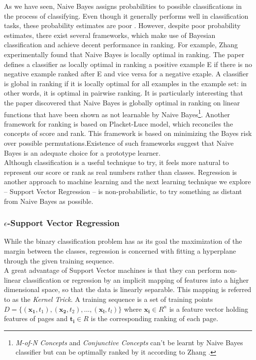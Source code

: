 \documentclass[12pt,twoside,notitlepage]{report}
\begin{document}
As we have seen, Naive Bayes assigns probabilities to possible classifications
in the process of classifying. Even though it generally performs well in
classification tasks, these probability estimates are poor \cite{domingos96}.
However, despite poor probability estimates, there exist several frameworks,
which make use of Bayesian classification and achieve decent performance in
ranking. For example, Zhang \cite{zhang04} experimentally found that Naive
Bayes is locally optimal in ranking. The paper defines a classifier as locally
optimal in ranking a positive example E if there is no negative example ranked
after E and vice versa for a negative exaple. A classifier is global in ranking
if it is locally optimal for all examples in the example set: in other words,
it is optimal in pairwise ranking.  It is particularly interesting that the
paper discovered that Naive Bayes is globally optimal in ranking on linear
functions that have been shown as not learnable by Naive
Bayes\footnote{\textit{M-of-N
  Concepts} and \textit{Conjunctive Concepts} can't be learnt by Naive Bayes classifier but
can be optimally ranked by it according to Zhang \cite{zhang04}.}.
Another framework for ranking \cite{bayesrank} is based on Placket-Luce model, which reconciles
the concepts of score and rank. This framework is based on minimizing the Bayes
risk over possible permutations.Existence of such frameworks suggest that Naive Bayes is an adequate choice
for a prototype learner.\\
Although classification is a useful technique to try, it feels more natural to
represent our score or rank as real numbers rather than classes. Regression is
another approach to machine learning and the next learning technique we explore
-- Support Vector Regression -- is non-probabilistic, to try something as distant
from Naive Bayes as possible.

\subsubsection*{\(\epsilon\)-Support Vector Regression}
While the binary classification problem has as its goal the maximization of the
margin between the classes, regression is concerned with fitting a hyperplane
through the given training sequence. \\
A great advantage of Support Vector machines is that they can perform
non-linear classification or regression by an implicit mapping of features into
a higher dimensional space, so that the data is linearly separable. This
mapping is referred to as the \textit{Kernel Trick}.
A training sequence is a set of training
points \(D = \{ (\mathbf{x_1},t_1), (\mathbf{x_2},t_2), ... ,
(\mathbf{x_l},t_l) \}\) where \( \mathbf{x_i} \in R^n \) is a feature vector
holding features of pages and \( \mathbf{t_i} \in R \) is the corresponding
ranking of each page.
\end{document}
